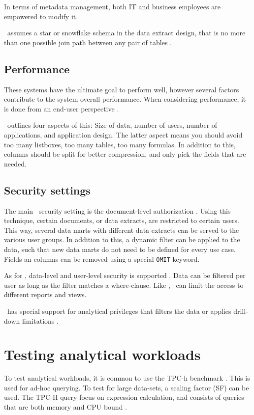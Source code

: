 In terms of metadata management, both IT and business employees are empowered to modify it.

\qlikview~assumes a star or snowflake schema in the data extract design, that is no more than one possible join path between any pair of tables \cite{noauthor_undated-js}.

\subsection{Performance}
\label{sub:Performance}
These systems have the ultimate goal to perform well, however several factors contribute to the system overall performance. When considering performance, it is done from an end-user perspective \cite{Qlik2011-yc}.

\qlikview~outlines four aspects of this: Size of data, number of users, number of applications, and application design. The latter aspect means you should avoid too many listboxes, too many tables, too many formulas. In addition to this, columns should be split for better compression, and only pick the fields that are needed.

\subsection{Security settings}
\label{sub:Security settings}

The main \qlikview~security setting is the document-level authorization \cite{Qlik2011}. Using this technique, certain documents, or data extracts, are restricted to certain users. This way, several data marts with different data extracts can be served to the various user groups. In addition to this, a dynamic filter can be applied to the data, such that new data marts do not need to be defined for every use case. Fields an columns can be removed using a special \texttt{OMIT} keyword.

As for \tableau, data-level and user-level security is supported \cite{Kamkolkar2015-iq}. Data can be filtered per user as long as the filter matches a where-clause. Like \qlikview, \tableau~can limit the access to different reports and views.

\saph~has special support for analytical privileges that filters the data or applies drill-down limitations \cite{Primsch2011-ij}.

\section{Testing analytical workloads}
\label{sec:Testing analytical workloads}
To test analytical workloads, it is common to use the TPC-h benchmark \cite{Boncz2002-yj}. This is used for ad-hoc querying. To test for large data-sets, a scaling factor (SF) can be used. The TPC-H query focus on expression calculation, and consists of queries that are both memory and CPU bound \cite{Boncz2005-wj}.

